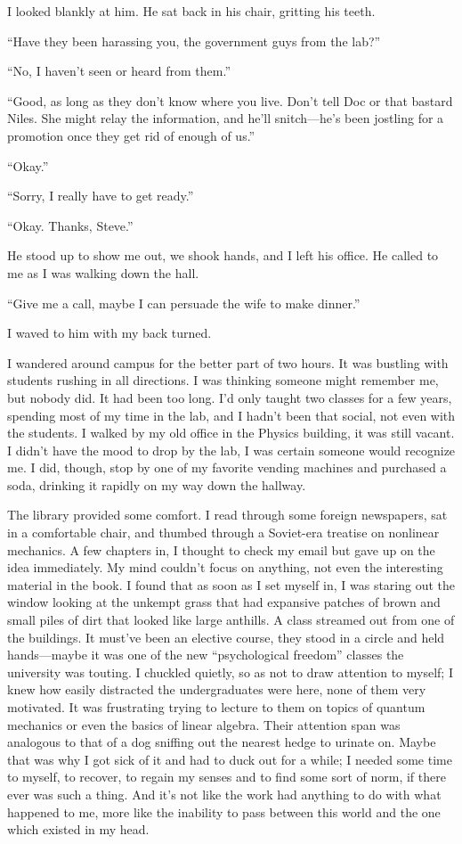 I looked blankly at him. He sat back in his chair, gritting his teeth.

``Have they been harassing you, the government guys from the lab?''

``No, I haven't seen or heard from them.''

``Good, as long as they don't know where you live. Don't tell Doc or
that bastard Niles. She might relay the information, and he'll
snitch---he's been jostling for a promotion once they get rid of enough
of us.''

``Okay.''

``Sorry, I really have to get ready.''

``Okay. Thanks, Steve.''

He stood up to show me out, we shook hands, and I left his office. He
called to me as I was walking down the hall.

``Give me a call, maybe I can persuade the wife to make dinner.''

I waved to him with my back turned.

I wandered around campus for the better part of two hours. It was
bustling with students rushing in all directions. I was thinking someone
might remember me, but nobody did. It had been too long. I'd only taught
two classes for a few years, spending most of my time in the lab, and I
hadn't been that social, not even with the students. I walked by my old
office in the Physics building, it was still vacant. I didn't have the
mood to drop by the lab, I was certain someone would recognize me. I
did, though, stop by one of my favorite vending machines and purchased a
soda, drinking it rapidly on my way down the hallway.

The library provided some comfort. I read through some foreign
newspapers, sat in a comfortable chair, and thumbed through a Soviet-era
treatise on nonlinear mechanics. A few chapters in, I thought to check
my email but gave up on the idea immediately. My mind couldn't focus on
anything, not even the interesting material in the book. I found that as
soon as I set myself in, I was staring out the window looking at the
unkempt grass that had expansive patches of brown and small piles of
dirt that looked like large anthills. A class streamed out from one of
the buildings. It must've been an elective course, they stood in a
circle and held hands---maybe it was one of the new ``psychological
freedom'' classes the university was touting. I chuckled quietly, so as
not to draw attention to myself; I knew how easily distracted the
undergraduates were here, none of them very motivated. It was
frustrating trying to lecture to them on topics of quantum mechanics or
even the basics of linear algebra. Their attention span was analogous to
that of a dog sniffing out the nearest hedge to urinate on. Maybe that
was why I got sick of it and had to duck out for a while; I needed some
time to myself, to recover, to regain my senses and to find some sort of
norm, if there ever was such a thing. And it's not like the work had
anything to do with what happened to me, more like the inability to pass
between this world and the one which existed in my head.

